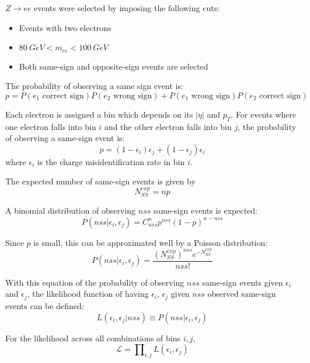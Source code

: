 $Z\rightarrow ee$ events were selected by imposing the following cuts:
\begin{itemize}
\item Events with two electrons
\item $80\ GeV < m_{ee} < 100\ GeV$
\item Both same-sign and opposite-sign events are selected
\end{itemize}

The probability of observing a same sign event is:
\begin{equation}
p = P(e_1 \text{ correct sign})P(e_2 \text{ wrong sign}) + P(e_1 \text{ wrong sign})P(e_2 \text{ correct sign})
\end{equation}

Each electron is assigned a bin which depends on its $|\eta|$ and $p_T$. For events where one electron falls into bin $i$ and the other electron falls into bin $j$, the probability of observing a same-sign event is: 
\begin{equation}
p =(1-\epsilon_i)\epsilon_j + (1-\epsilon_j)\epsilon_i
\end{equation}
where $\epsilon_i$ is the charge misidentification rate in bin $i$.

The expected number of same-sign events is given by
\begin{equation}
N^{exp}_{SS} = np 
\end{equation}

A binomial distribution of observing $nss$ same-sign events is expected:
\begin{equation}
P(nss |\epsilon_i, \epsilon_j) =  C^n_{nss} p^{nss}(1-p)^{n-nss}
\end{equation}

Since $p$ is small, this can be approximated well by a Poisson distribution: 
\begin{equation}
P(nss |\epsilon_i, \epsilon_j) = \frac{(N^{exp}_{SS})^{nss} e^{-N^{exp}_{SS}}}{nss!}
\end{equation}

With this equation of the probability of observing $nss$ same-sign events given $\epsilon_i$ and $\epsilon_j$, the likelihood function of having $\epsilon_i$, $\epsilon_j$ given $nss$ observed same-sign events can be defined: 
\begin{equation}
L(\epsilon_i, \epsilon_j | nss) \equiv P(nss |\epsilon_i, \epsilon_j)
\end{equation}

For the likelihood across all combinations of bins $i,j$,
\begin{equation}
\mathcal{L} = \prod\nolimits_{i,j} L(\epsilon_i, \epsilon_j)
\end{equation}

